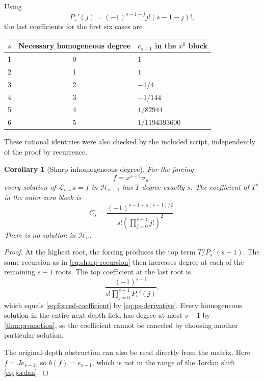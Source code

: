\documentclass[11pt,a4paper]{article}
\numberwithin{equation}{section}
\newtheorem{corollary}[corollary]{Corollary}
\theoremstyle{definition}
\theoremstyle{remark}
\newcommand{\HH}{\mathcal H}
\newcommand{\cL}{\mathcal L}
\begin{document}
Using
\begin{equation}
 P_s'(j)=(-1)^{s-1-j}j!(s-1-j)!,
 \label{eq:ps-derivative}
\end{equation}
the last coefficients for the first six cases are
\begin{center}
\begin{tabular}{ccl}
\toprule
$s$ & Necessary homogeneous degree & $c_{s-1}$ in the $x^0$ block\\
\midrule
1 & 0 & $1$\\
2 & 1 & $1$\\
3 & 2 & $-1/4$\\
4 & 3 & $-1/144$\\
5 & 4 & $1/82944$\\
6 & 5 & $1/1194393600$\\
\bottomrule
\end{tabular}
\end{center}
These rational identities were also checked by the included script, independently of the proof by recurrence.

\begin{corollary}[Sharp inhomogeneous degree]
\label{cor:sharp-forcing}
For the forcing
\begin{equation}
 f=x^{s-1}\sigma_n,
 \label{eq:sharp-forcing}
\end{equation}
every solution of $\cL_{n,s}u=f$ in $\HH_{n+1}$ has $T$-degree exactly $s$. The coefficient of $T^s$ in the outer-zero block is
\begin{equation}
 C_s=\frac{(-1)^{s-1+s(s-1)/2}}
 {s!\left(\prod_{j=0}^{s-1}j!\right)^2}.
 \label{eq:forced-coefficient}
\end{equation}
There is no solution in $\HH_n$.
\end{corollary}
\begin{proof}
At the highest root, the forcing produces the top term $T/P_s'(s-1)$. The same recursion as in \eqref{eq:sharp-recursion} then increases degree at each of the remaining $s-1$ roots. The top coefficient at the last root is
\[
 \frac{(-1)^{s-1}}{s!\prod_{j=0}^{s-1}P_s'(j)},
\]
which equals \eqref{eq:forced-coefficient} by \eqref{eq:ps-derivative}. Every homogeneous solution in the entire next-depth field has degree at most $s-1$ by \cref{thm:promotion}, so the coefficient cannot be canceled by choosing another particular solution.

The original-depth obstruction can also be read directly from the matrix. Here $f=Je_{s-1}$, so $b(f)=e_{s-1}$, which is not in the range of the Jordan shift \eqref{eq:jordan}.
\end{proof}
\end{document}
